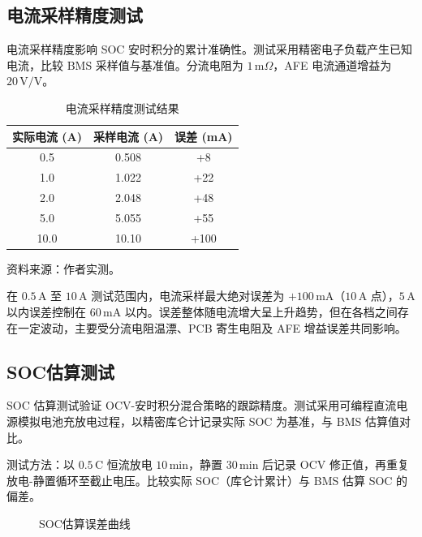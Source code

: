 \subsection{电流采样精度测试}

电流采样精度影响 SOC 安时积分的累计准确性。测试采用精密电子负载产生已知电流，比较 BMS 采样值与基准值。分流电阻为 $1\,\mathrm{m}\Omega$，AFE 电流通道增益为 $20\,\mathrm{V/V}$。

\begin{table}[htbp]
  \centering
  \caption{电流采样精度测试结果}
  \label{tab:current_accuracy}
  \begin{tabular}{@{}ccc@{}}
    \toprule
    \textbf{实际电流 (A)} & \textbf{采样电流 (A)} & \textbf{误差 (mA)} \\
    \midrule
    0.5  & 0.508 & +8 \\
    1.0  & 1.022 & +22 \\
    2.0  & 2.048 & +48 \\
    5.0  & 5.055 & +55 \\
    10.0 & 10.10 & +100 \\
    \bottomrule
  \end{tabular}
\end{table}
\vspace{-0.3em}
{\small 资料来源：作者实测。}

在 $0.5\,\mathrm{A}$ 至 $10\,\mathrm{A}$ 测试范围内，电流采样最大绝对误差为 $+100\,\mathrm{mA}$（$10\,\mathrm{A}$ 点），$5\,\mathrm{A}$ 以内误差控制在 $60\,\mathrm{mA}$ 以内。误差整体随电流增大呈上升趋势，但在各档之间存在一定波动，主要受分流电阻温漂、PCB 寄生电阻及 AFE 增益误差共同影响。

\subsection{SOC估算测试}

SOC 估算测试验证 OCV-安时积分混合策略的跟踪精度。测试采用可编程直流电源模拟电池充放电过程，以精密库仑计记录实际 SOC 为基准，与 BMS 估算值对比。

测试方法：以 $0.5\,\mathrm{C}$ 恒流放电 $10\,\mathrm{min}$，静置 $30\,\mathrm{min}$ 后记录 OCV 修正值，再重复放电-静置循环至截止电压。比较实际 SOC（库仑计累计）与 BMS 估算 SOC 的偏差。

\begin{figure}[htbp]
  \centering
  \caption{SOC估算误差曲线}
  \label{fig:soc_error_curve}
\end{figure}

